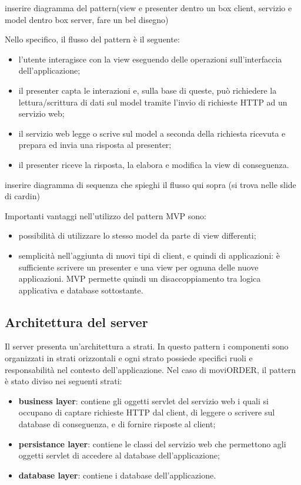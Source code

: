inserire diagramma del pattern(view e presenter dentro un box client, servizio e model dentro box server, fare un bel disegno)

Nello specifico, il flusso del pattern è il seguente:
\begin{itemize}
	\item l'utente interagisce con la view eseguendo delle operazioni sull'interfaccia dell'applicazione;
	\item il presenter capta le interazioni e, sulla base di queste, può richiedere la lettura/scrittura di dati sul model tramite l'invio di richieste HTTP ad un servizio web;
	\item il servizio web legge o scrive sul model a seconda della richiesta ricevuta e prepara ed invia una risposta al presenter;
	\item il presenter riceve la risposta, la elabora e modifica la view di conseguenza.
\end{itemize}

inserire diagramma di sequenza che spieghi il flusso qui sopra (si trova nelle slide di cardin)

Importanti vantaggi nell'utilizzo del pattern MVP sono:
\begin{itemize}
	\item possibilità di utilizzare lo stesso model da parte di view differenti;
	\item semplicità nell'aggiunta di nuovi tipi di client, e quindi di applicazioni: è sufficiente scrivere un presenter e una view per ognuna delle nuove applicazioni. MVP permette quindi un disaccoppiamento tra logica applicativa e database sottostante.
\end{itemize}

\subsection{Architettura del server}

Il server presenta un'architettura a strati. In questo pattern i componenti sono organizzati in strati orizzontali e ogni strato possiede specifici ruoli e responsabilità nel contesto dell'applicazione. Nel caso di moviORDER, il pattern è stato diviso nei seguenti strati:
\begin{itemize}
	\item \textbf{business layer}: contiene gli oggetti servlet del servizio web i quali si occupano di captare richieste HTTP dal client, di leggere o scrivere sul database di conseguenza, e di fornire risposte al client;
	\item \textbf{persistance layer}: contiene le classi del servizio web che permettono agli oggetti servlet di accedere al database dell'applicazione;
	\item \textbf{database layer}: contiene i database dell'applicazione.
\end{itemize}

